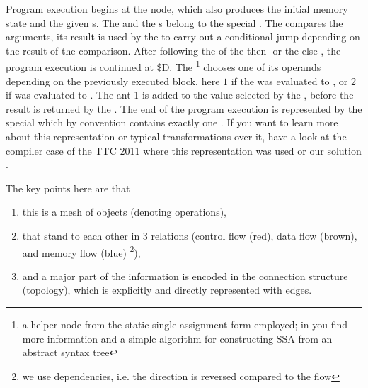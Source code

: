 Program execution begins at the  node, which also produces the initial memory state and the given s.
The  and the s belong to the special .
The  compares the arguments, its result is used by the  to carry out a conditional jump depending on the result of the comparison.
After following the  of the then- or the else-, the program execution is continued at  \$D.
The \footnote{a helper node from the static single assignment form employed; in \cite{braun13cc} you find more information and a simple algorithm for constructing SSA from an abstract syntax tree} 
chooses one of its operands depending on the previously executed block,
here  $1$ if the  was evaluated to ,
or  $2$ if  was evaluated to .
The ant 1 is added to the value selected by the ,
before the result is returned by the .
The end of the program execution is represented by the special  which by convention contains exactly one .
If you want to learn more about this representation or typical transformations over it, have a look at the compiler case\cite{CompilerCase} of the TTC 2011 where this representation was used or our solution \cite{CompilerOptimization}.

The key points here are that
\begin{enumerate}
	\item this is a mesh of objects (denoting operations),
	\item that stand to each other in 3 relations (control flow (red), data flow (brown), and memory flow (blue) \footnote{we use dependencies, i.e. the direction is reversed compared to the flow}), 
	\item and a major part of the information is encoded in the connection structure (topology),
	which is explicitly and directly represented with edges.
\end{enumerate}

